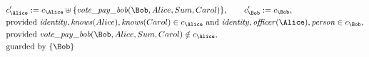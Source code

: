 \begin{align*}
&
c'_
{
\Alice
}
 := 
c_
{
\Alice
}
 \uplus 
\{
\mathit{\detokenize{
vote_pay_bob
}}
(
\Bob
,
Alice
,
Sum
,
Carol
)
\}
, \qquad 
c'_
{
\Bob
}
 := 
c_
{
\Bob
}
,\\
&
\text{provided } 
\mathit{\detokenize{
identity
}}
,
\mathit{\detokenize{
knows
}}
(
Alice
)
,
\mathit{\detokenize{
knows
}}
(
Carol
)
 \in c_
{
\Alice
}
 \text{ and } 
\mathit{\detokenize{
identity
}}
,
\mathit{\detokenize{
officer
}}
(
\Alice
)
,
\mathit{\detokenize{
person
}}
 \in c_
{
\Bob
}
,\\
&
\text{provided } 
\mathit{\detokenize{
vote_pay_bob
}}
(
\Bob
,
Alice
,
Sum
,
Carol
)
 \notin c_
{
\Alice
}
,\\
&
\text{guarded by } \{
\Bob
\}
\end{align*}

